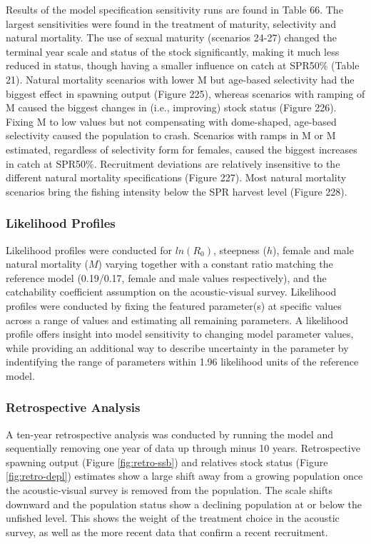 \documentclass[11pt,
  english,
  letterpaper,
]{article}
\begin{document}
Results of the model specification sensitivity runs are found in Table 66. The largest sensitivities were found in the treatment of maturity, selectivity and natural mortality. The use of sexual maturity (scenarios 24-27) changed the terminal year scale and status of the stock significantly, making it much less reduced in status, though having a smaller influence on catch at SPR50\% (Table 21). Natural mortality scenarios with lower M but age-based selectivity had the biggest effect in spawning output (Figure 225), whereas scenarios with ramping of M caused the biggest changes in (i.e., improving) stock status (Figure 226). Fixing M to low values but not compensating with dome-shaped, age-based selectivity caused the population to crash. Scenarios with ramps in M or M estimated, regardless of selectivity form for females, caused the biggest increases in catch at SPR50\%. Recruitment deviations are relatively insensitive to the different natural mortality specifications (Figure 227). Most natural mortality scenarios bring the fishing intensity below the SPR harvest level (Figure 228).

\hypertarget{likelihood-profiles}{%
\subsubsection{Likelihood Profiles}\label{likelihood-profiles}}

Likelihood profiles were conducted for \(ln(R_0)\), steepness (\(h\)), female and male natural mortality (\(M\)) varying together with a constant ratio matching the reference model (0.19/0.17, female and male values respectively), and the catchability coefficient assumption on the acoustic-visual survey. Likelihood profiles were conducted by fixing the featured parameter(s) at specific values across a range of values and estimating all remaining parameters. A likelihood profile offers insight into model sensitivity to changing model parameter values, while providing an additional way to describe uncertainty in the parameter by indentifying the range of parameters within 1.96 likelihood units of the reference model.

\hypertarget{retrospective-analysis}{%
\subsubsection{Retrospective Analysis}\label{retrospective-analysis}}

A ten-year retrospective analysis was conducted by running the model and sequentially removing one year of data up through minus 10 years. Retrospective spawning output (Figure \ref{fig:retro-ssb}) and relatives stock status (Figure \ref{fig:retro-depl}) estimates show a large shift away from a growing population once the acoustic-visual survey is removed from the population. The scale shifts downward and the population status show a declining population at or below the unfished level. This shows the weight of the treatment choice in the acoustic survey, as well as the more recent data that confirm a recent recruitment.
\end{document}
